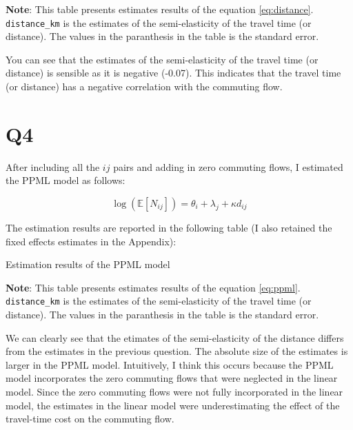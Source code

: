 \documentclass[
  11pt]{article}
\begin{document}
\footnotesize \textbf{Note}: This table presents estimates results of
the equation \ref{eq:distance}. \texttt{distance\_km} is the estimates
of the semi-elasticity of the travel time (or distance). The values in
the paranthesis in the table is the standard error.\vspace{3em}

\normalsize

You can see that the estimates of the semi-elasticity of the travel time
(or distance) is sensible as it is negative (-0.07). This indicates that
the travel time (or distance) has a negative correlation with the
commuting flow.

\section*{Q4}\label{q4}

After including all the \(ij\) pairs and adding in zero commuting flows,
I estimated the PPML model as follows:

\[
\log(\mathbb{E}[N_{ij}])= \theta_{i} + \lambda_{j} + \kappa d_{ij}\label{eq:ppml}
\]

The estimation results are reported in the following table (I also
retained the fixed effects estimates in the Appendix):

\begin{table}[!ht]
\centering
\caption{Estimation results of the PPML model}
\label{tab:est_ppml}

\end{table}

\footnotesize \textbf{Note}: This table presents estimates results of
the equation \ref{eq:ppml}. \texttt{distance\_km} is the estimates of
the semi-elasticity of the travel time (or distance). The values in the
paranthesis in the table is the standard error.\vspace{3em}

\normalsize

We can clearly see that the etimates of the semi-elasticity of the
distance differs from the estimates in the previous question. The
absolute size of the estimates is larger in the PPML model. Intuitively,
I think this occurs because the PPML model incorporates the zero
commuting flows that were neglected in the linear model. Since the zero
commuting flows were not fully incorporated in the linear model, the
estimates in the linear model were underestimating the effect of the
travel-time cost on the commuting flow.
\end{document}
